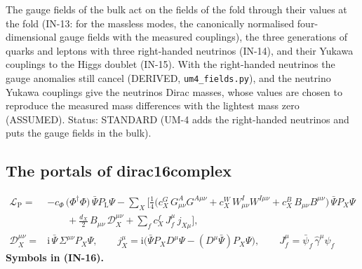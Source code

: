 \documentclass[
  10pt,
]{article}
\begin{document}
The gauge fields of the bulk act on the fields of the fold through their
values at the fold (IN-13: for the massless modes, the canonically
normalised four-dimensional gauge fields with the measured couplings),
the three generations of quarks and leptons with three right-handed
neutrinos (IN-14), and their Yukawa couplings to the Higgs doublet
(IN-15). With the right-handed neutrinos the gauge anomalies still
cancel (DERIVED, \texttt{um4\_fields.py}), and the neutrino Yukawa
couplings give the neutrinos Dirac masses, whose values are chosen to
reproduce the measured mass differences with the lightest mass zero
(ASSUMED). Status: STANDARD (UM-4 adds the right-handed neutrinos and
puts the gauge fields in the bulk).

\hypertarget{the-portals-of-dirac16complex}{%
\subsection{The portals of
dirac16complex}\label{the-portals-of-dirac16complex}}

\[
\begin{aligned}
\mathcal{L}_{\mathrm{P}} = {}&-c_\Phi\,\big(\Phi^\dagger\Phi\big)\,\bar\Psi P_{\mathrm{L}}\Psi
 - \sum_{X}\Big[\frac14\big(c^{G}_X\,G^A_{\mu\nu}G^{A\mu\nu} + c^{W}_X\,W^I_{\mu\nu}W^{I\mu\nu}
 + c^{B}_X\,B_{\mu\nu}B^{\mu\nu}\big)\,\bar\Psi P_X\Psi\\
&\qquad + \frac{d_X}{2}\,B_{\mu\nu}\,\mathcal{D}_X^{\mu\nu} + \sum_{f} c^{f}_X\,J_f^\mu\,j_{X\mu}\Big],\\
\mathcal{D}_X^{\mu\nu} = {}&\mathrm{i}\,\bar\Psi\,\Sigma^{\mu\nu}P_X\Psi,\qquad
j_X^\mu = \mathrm{i}\big(\bar\Psi P_X D^\mu\Psi - (D^\mu\bar\Psi)P_X\Psi\big),\qquad
J_f^\mu = \bar\psi_f\,\hat\gamma^\mu\psi_f
\end{aligned} \tag{IN-16}
\] \textbf{Symbols in (IN-16).}
\end{document}
